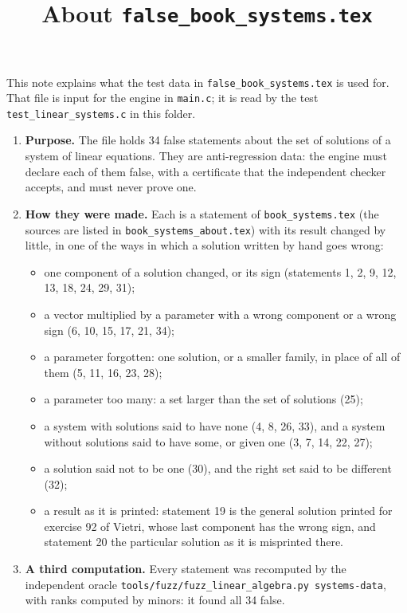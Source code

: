 \documentclass[11pt,a4paper]{article}
\title{About \texttt{false\_book\_systems.tex}}
\author{}
\date{}
\begin{document}
\maketitle
This note explains what the test data in \texttt{false\_book\_systems.tex} is used for. That file is input for the engine in \texttt{main.c}; it is read by the test \texttt{test\_linear\_systems.c} in this folder.

\begin{enumerate}
\item \textbf{Purpose.} The file holds 34 false statements about the set of solutions of a system of linear equations. They are anti-regression data: the engine must declare each of them false, with a certificate that the independent checker accepts, and must never prove one.

\item \textbf{How they were made.} Each is a statement of \texttt{book\_systems.tex} (the sources are listed in \texttt{book\_systems\_about.tex}) with its result changed by little, in one of the ways in which a solution written by hand goes wrong:
\begin{itemize}
\item one component of a solution changed, or its sign (statements 1, 2, 9, 12, 13, 18, 24, 29, 31);
\item a vector multiplied by a parameter with a wrong component or a wrong sign (6, 10, 15, 17, 21, 34);
\item a parameter forgotten: one solution, or a smaller family, in place of all of them (5, 11, 16, 23, 28);
\item a parameter too many: a set larger than the set of solutions (25);
\item a system with solutions said to have none (4, 8, 26, 33), and a system without solutions said to have some, or given one (3, 7, 14, 22, 27);
\item a solution said not to be one (30), and the right set said to be different (32);
\item a result as it is printed: statement 19 is the general solution printed for exercise 92 of Vietri, whose last component has the wrong sign, and statement 20 the particular solution as it is misprinted there.
\end{itemize}

\item \textbf{A third computation.} Every statement was recomputed by the independent oracle \texttt{tools/fuzz/fuzz\_linear\_algebra.py systems-data}, with ranks computed by minors: it found all 34 false.


\end{enumerate}
\end{document}

